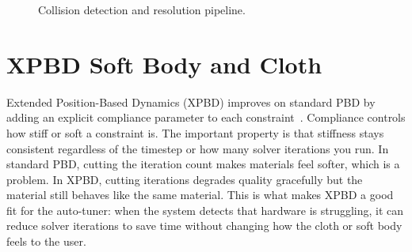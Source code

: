 \documentclass[9pt,openany]{extbook}
\begin{document}
\begin{figure}[h]
\centering
{}
\caption{Collision detection and resolution pipeline.}
\label{fig:collision_pipeline}
\end{figure}

\section{XPBD Soft Body and Cloth}

Extended Position-Based Dynamics (XPBD) improves on standard PBD by adding an explicit compliance parameter to each constraint~\cite{muller2007pbd,macklin2016xpbd}. Compliance controls how stiff or soft a constraint is. The important property is that stiffness stays consistent regardless of the timestep or how many solver iterations you run. In standard PBD, cutting the iteration count makes materials feel softer, which is a problem. In XPBD, cutting iterations degrades quality gracefully but the material still behaves like the same material. This is what makes XPBD a good fit for the auto-tuner: when the system detects that hardware is struggling, it can reduce solver iterations to save time without changing how the cloth or soft body feels to the user.
\end{document}
